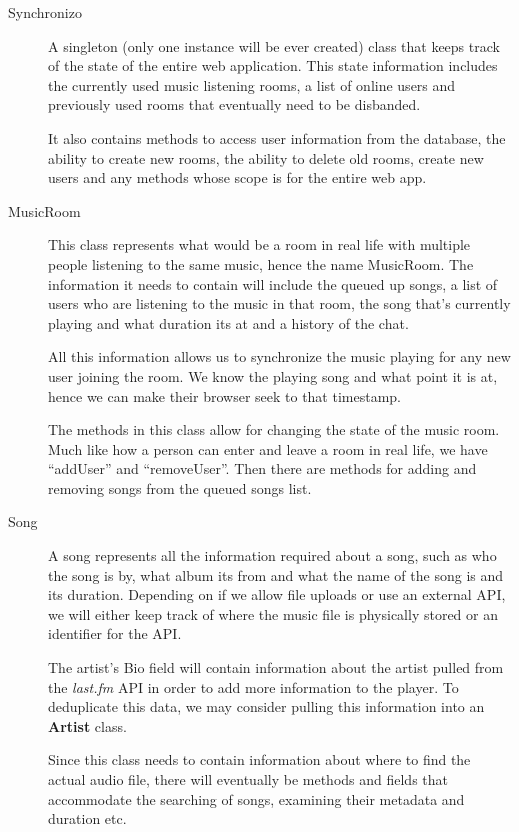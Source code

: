 \documentclass[12pt]{report}
\begin{document}
\begin{description}
    \item [Synchronizo] A singleton (only one instance will be ever created) class that keeps track of the state of the entire web application. This state information includes the currently used music listening rooms, a list of online users and previously used rooms that eventually need to be disbanded.
    
    It also contains methods to access user information from the database, the ability to create new rooms, the ability to delete old rooms, create new users and any methods whose scope is for the entire web app.
    
    \item[MusicRoom] This class represents what would be a room in real life with multiple people listening to the same music, hence the name MusicRoom. The information it needs to contain will include the queued up songs, a list of users who are listening to the music in that room, the song that's currently playing and what duration its at and a history of the chat.
    
    All this information allows us to synchronize the music playing for any new user joining the room. We know the playing song and what point it is at, hence we can make their browser seek to that timestamp.
    
    The methods in this class allow for changing the state of the music room. Much like how a person can enter and leave a room in real life, we have ``addUser'' and ``removeUser''. Then there are methods for adding and removing songs from the queued songs list.
    
    \item[Song] A song represents all the information required about a song, such as who the song is by, what album its from and what the name of the song is and its duration. Depending on if we allow file uploads or use an external API, we will either keep track of where the music file is physically stored or an identifier for the API. 
    
    The artist's Bio field will contain information about the artist pulled from the \textit{last.fm} API in order to add more information to the player. To deduplicate this data, we may consider pulling this information into an \textbf{Artist} class.
    
    Since this class needs to contain information about where to find the actual audio file, there will eventually be methods and fields that accommodate the searching of songs, examining their metadata and duration etc.
    

\end{description}
\end{document}
